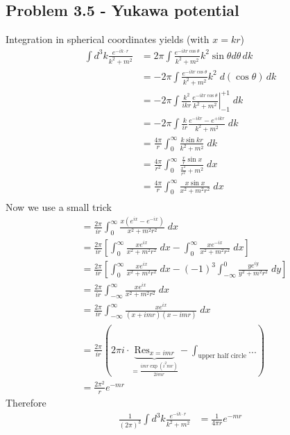 \documentclass[10pt,a4paper]{book}
\theoremstyle{definition}
\begin{document}
\subsection{Problem 3.5 - Yukawa potential}
Integration in spherical coordinates yields (with $x=kr$)
\begin{align}
    \int d^3k\frac{e^{-ik\cdot r}}{k^2+m^2}
    &=2\pi\int  \frac{e^{-ikr\cos{\theta}}}{k^2+m^2} k^2\sin\theta d\theta\, dk\\
    &=-2\pi\int \frac{e^{-ikr\cos{\theta}}}{k^2+m^2} k^2 \; d(\cos\theta)\, dk\\
    &=-2\pi\int \left.\frac{k^2}{ikr}\frac{e^{-ikr\cos{\theta}}}{k^2+m^2} \right|_{-1}^{+1} \; dk\\
    &=-2\pi\int \frac{k}{ir}\frac{e^{-ikr}-e^{+ikr}}{k^2+m^2}  \; dk\\
    &=\frac{4\pi}{r}\int_0^\infty  \frac{k\sin{kr}}{k^2+m^2}  \; dk\\
    &=\frac{4\pi}{r^2}\int_0^\infty  \frac{\frac{x}{r}\sin{x}}{\frac{x^2}{r^2}+m^2}  \; dx\\
    &=\frac{4\pi}{r}\int_0^\infty  \frac{x\sin{x}}{x^2+m^2r^2}  \; dx\\
\end{align}
Now we use a small trick
\begin{align}
    &=\frac{2\pi}{ir}\int_0^\infty  \frac{x(e^{ix}-e^{-ix})}{x^2+m^2r^2}  \; dx\\
    &=\frac{2\pi}{ir}\left[\int_0^\infty\frac{xe^{ix}}{x^2+m^2r^2}  \; dx - \int_0^\infty\frac{xe^{-ix}}{x^2+m^2r^2}  \; dx\right]\\
    &=\frac{2\pi}{ir}\left[\int_0^\infty\frac{xe^{ix}}{x^2+m^2r^2}  \; dx - (-1)^3 \int_{-\infty}^0\frac{ye^{iy}}{y^2+m^2r^2}  \; dy\right]\\
    &=\frac{2\pi}{ir}\int_{-\infty}^\infty\frac{xe^{ix}}{x^2+m^2r^2}  \; dx \\
    &=\frac{2\pi}{ir}\int_{-\infty}^\infty\frac{xe^{ix}}{(x+imr)(x-imr)}  \; dx \\
    &= \frac{2\pi}{ir}\left(2\pi i\cdot \underbrace{\text{Res}_{x=imr}}_{=\frac{imr\exp(i^2mr)}{2imr}}-\int_\text{upper half circle}...\right)\\
    &= \frac{2\pi^2}{r} e^{-mr}
\end{align}
Therefore
\begin{align}
    \frac{1}{(2\pi)^3}\int d^3k\frac{e^{-ik\cdot r}}{k^2+m^2}
    &= \frac{1}{4\pi r} e^{-mr}
\end{align}
\end{document}
